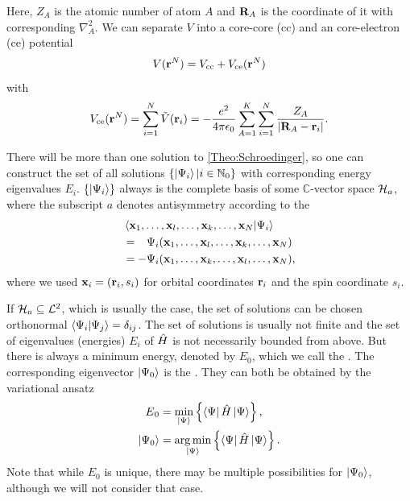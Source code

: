 \documentclass[8.5pt,twoside,twocolumn]{article}
\renewcommand\Hil{\enmat{\mathcal H_a}}
\renewcommand\r{\bo r}
\theoremstyle{standard}
\begin{document}
Here, $Z_A$ is the atomic number of atom $A$ and $\mathbf{R}_A$ is the coordinate of it with corresponding $\nabla_A^2$. We
can separate $V$ into a core-core (cc) and an core-electron (ce) potential
\newcommand\vce{V_{\te{ce}}}
\newcommand\vcc{V_{\te{cc}}}
\begin{equation}
 V(\r^N)=\vcc+\vce(\r^N)
\label{Theo:SeparatePotential}
\end{equation}
with
\begin{equation}
 \vce(\r^N)=\sum_{i=1}^N \tilde V(\r_i) = - \frac {e^2} {4 \pi \e_0} \sum_{A=1}^K \sum_{i=1}^N \frac {Z_A} {\abs{\bo R_A - \r_i}}.
 \label{Theo:CoreElectronPotential}
\end{equation}



There will be more than one solution to \eqref{Theo:Schroedinger}, so one can construct the set of all solutions $\left\{{\left|\Psi{_i}\right\rangle | i \in \mathbb{N}_0} \right\}$
with corresponding energy eigenvalues $E_i$. $\left\{{\left|\Psi{_i}\right\rangle} \right\}$ always is the complete basis of
some $\mathbb C$-vector space $\Hil$, where the subscript $a$ denotes antisymmetry according 
to the 
\begin{equation}
\begin{aligned}
 &\bkt{\x_1,\ldots,\x_l,\ldots,\x_k,\ldots,\x_N | \Psi_i } \\
 &=\ph - \Psi_i(\x_1,\ldots,\x_l,\ldots,\x_k,\ldots,\x_N) \\
 &= - \Psi_i(\x_1,\ldots,\x_k,\ldots,\x_l,\ldots,\x_N),
\end{aligned}
\label{Theo:Pauli}
\end{equation}
where we used $\x_i=(\r_i,s_i)$ for orbital coordinates $\r_i$ and the spin coordinate $s_i$.

 If $\Hil \suseq \mathcal {L}^2$, which is usually the case,
the set of solutions can be chosen orthonormal $\left\langle{\Psi_i | \Psi_j}\right\rangle = \delta_{ij}$.
The set of solutions is usually not finite and the set of eigenvalues (energies) $E_i$ of $\hat{H}$
is not necessarily bounded from above. But there is always a minimum energy, denoted by $E_0$, 
which we call the . The corresponding eigenvector 
$\left|\Psi{_0}\right\rangle$ is the . They can both be obtained by the
variational ansatz
\begin{equation}
\begin{aligned}
 E{_0}&= \min_{\left|\Psi{}\right\rangle} \left\{{ \left\langle\Psi{}\right| \hat{H} \left|\Psi{}\right\rangle} \right\}, \\
 \left|\Psi{_0}\right\rangle&= \operatorname*{arg\,min}_{\left|\Psi{}\right\rangle} \left\{{ \left\langle\Psi{}\right| \hat{H} \left|\Psi{}\right\rangle} \right\}.
\end{aligned}
\label{Theo:Variation}
\end{equation}
Note that while $E_0$ is unique, there may be multiple possibilities for $\left|\Psi{_0}\right\rangle$, although
we will not consider that case.
\end{document}
